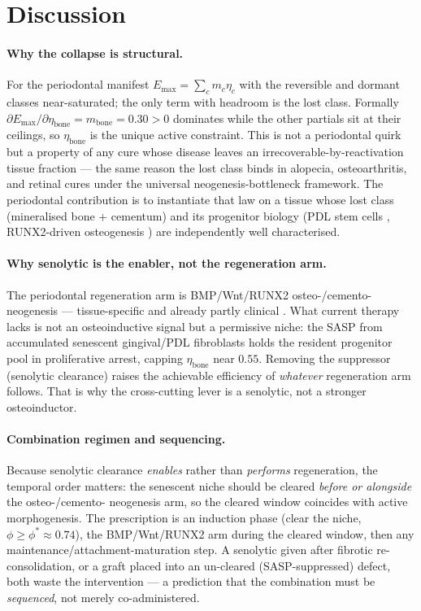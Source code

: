 \documentclass[11pt,a4paper]{article}
\begin{document}
\section{Discussion}
\label{sec:discussion}
\paragraph{Why the collapse is structural.} For the periodontal manifest
$E_{\max}=\sum_c m_c\eta_c$ with the reversible and dormant classes near-saturated;
the only term with headroom is the lost class. Formally
$\partial E_{\max}/\partial\eta_{\text{bone}}=m_{\text{bone}}=0.30>0$ dominates while
the other partials sit at their ceilings, so $\eta_{\text{bone}}$ is the unique active
constraint. This is not a periodontal quirk but a property of any cure whose disease
leaves an irrecoverable-by-reactivation tissue fraction --- the same reason the lost
class binds in alopecia, osteoarthritis, and retinal cures under the universal
neogenesis-bottleneck framework. The periodontal contribution is to instantiate that
law on a tissue whose lost class (mineralised bone + cementum) and its progenitor
biology (PDL stem cells \citep{seo2004}, RUNX2-driven osteogenesis \citep{komori2010})
are independently well characterised.
\paragraph{Why senolytic is the enabler, not the regeneration arm.} The periodontal
regeneration arm is BMP/Wnt/RUNX2 osteo-/cemento-neogenesis \citep{wozney1988,
komori2010} --- tissue-specific and already partly clinical \citep{hammarstrom1997,
kao2015}. What current therapy lacks is not an osteoinductive signal but a permissive
niche: the SASP from accumulated senescent gingival/PDL fibroblasts
\citep{coppe2010} holds the resident progenitor pool in proliferative arrest, capping
$\eta_{\text{bone}}$ near $0.55$. Removing the suppressor (senolytic clearance) raises
the achievable efficiency of \emph{whatever} regeneration arm follows. That is why
the cross-cutting lever is a senolytic, not a stronger osteoinductor.
\paragraph{Combination regimen and sequencing.} Because senolytic clearance
\emph{enables} rather than \emph{performs} regeneration, the temporal order matters:
the senescent niche should be cleared \emph{before or alongside} the osteo-/cemento-
neogenesis arm, so the cleared window coincides with active morphogenesis. The
prescription is an induction phase (clear the niche, $\phi\geq\phi^\ast\approx 0.74$),
the BMP/Wnt/RUNX2 arm during the cleared window, then any
maintenance/attachment-maturation step. A senolytic given after fibrotic
re-consolidation, or a graft placed into an un-cleared (SASP-suppressed) defect, both
waste the intervention --- a prediction that the combination must be \emph{sequenced},
not merely co-administered.
\end{document}
